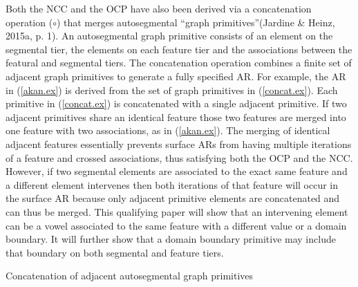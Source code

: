 \documentclass[,doc,floatsintext]{apa6}
\theoremstyle{definition}
\theoremstyle{definition}
\theoremstyle{definition}
\theoremstyle{remark}
\begin{document}
Both the NCC and the OCP have also been derived via a concatenation
operation (\(\circ\)) that merges autosegmental \enquote{graph
primitives}(Jardine \& Heinz, 2015a, p. 1). An autosegmental graph
primitive consists of an element on the segmental tier, the elements on
each feature tier and the associations between the featural and
segmental tiers. The concatenation operation combines a finite set of
adjacent graph primitives to generate a fully specified AR. For example,
the AR in (\ref{akan.ex}) is derived from the set of graph primitives in
(\ref{concat.ex}). Each primitive in (\ref{concat.ex}) is concatenated
with a single adjacent primitive. If two adjacent primitives share an
identical feature those two features are merged into one feature with
two associations, as in (\ref{akan.ex}). The merging of identical
adjacent features essentially prevents surface ARs from having multiple
iterations of a feature and crossed associations, thus satisfying both
the OCP and the NCC. However, if two segmental elements are associated
to the exact same feature and a different element intervenes then both
iterations of that feature will occur in the surface AR because only
adjacent primitive elements are concatenated and can thus be merged.
This qualifying paper will show that an intervening element can be a
vowel associated to the same feature with a different value or a domain
boundary. It will further show that a domain boundary primitive may
include that boundary on both segmental and feature tiers.

\begin{exe}
\ex \label{concat.ex} Concatenation of adjacent autosegmental graph primitives \\
\end{exe}\newpage
\end{document}
